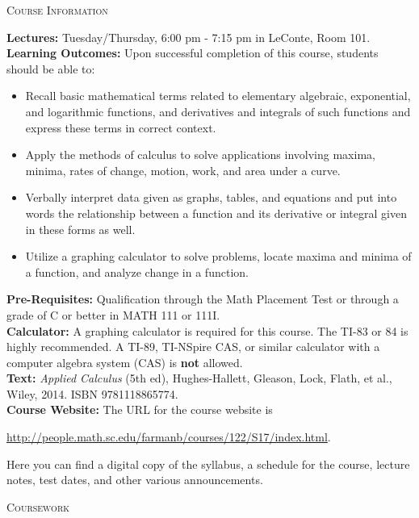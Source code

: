 \documentclass[teaching.portfolio.tex]{subfiles}
\begin{document}
\begin{center}
  \textsc{Course Information}
\end{center}
\noindent
\textbf{Lectures:}
Tuesday/Thursday,  6:00 pm - 7:15 pm in LeConte, Room 101.\\
\textbf{Learning Outcomes:} 
Upon successful completion of this course, students should be able to:
\begin{itemize}
\item
  Recall basic mathematical terms related to elementary algebraic, exponential, and logarithmic functions, and derivatives and integrals of such functions and express these terms in correct context.
\item
  Apply the methods of calculus to solve applications involving maxima, minima, rates of change, motion, work, and area under a curve.
\item
  Verbally interpret data given as graphs, tables, and equations and put into words the relationship between a function and its derivative or integral given in these forms as well.
\item
  Utilize a graphing calculator to solve problems, locate maxima and minima of a function, and analyze change in a function.
\end{itemize}

\noindent
\textbf{Pre-Requisites:} 
Qualification through the Math Placement Test or through a grade of C or better in MATH 111 or 111I.\\

\noindent
\textbf{Calculator:}
A graphing calculator is required for this course.
The TI-83 or 84 is highly recommended.
A TI-89, TI-NSpire CAS, or similar calculator with a computer algebra system (CAS) is \textbf{not} allowed.\\

\noindent
\textbf{Text:} 
\textit{Applied Calculus} (5th ed), Hughes-Hallett, Gleason, Lock, Flath, et al., Wiley, 2014.  ISBN 9781118865774.\\

\noindent
\textbf{Course Website:} 
The URL for the course website is
\begin{center}
  \url{http://people.math.sc.edu/farmanb/courses/122/S17/index.html}.
\end{center}
Here you can find a digital copy of the syllabus, a schedule for the course, lecture notes, test dates, and other various announcements.

\noindent
\begin{center}
  \textsc{Coursework}
\end{center}
\end{document}
